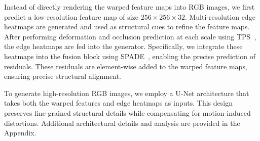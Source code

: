 Instead of directly rendering the warped feature maps into RGB images, we first predict a low-resolution feature map of size \( 256 \times 256 \times 32 \). Multi-resolution edge heatmaps are generated and used as structural cues to refine the feature maps. After performing deformation and occlusion prediction at each scale using TPS~\cite{zhao2022thin}, the edge heatmaps are fed into the generator. Specifically, we integrate these heatmaps into the fusion block using SPADE~\cite{park2019SPADE}, enabling the precise prediction of residuals. These residuals are element-wise added to the warped feature maps, ensuring precise structural alignment.

To generate high-resolution RGB images, we employ a U-Net architecture that takes both the warped features and edge heatmaps as inputs. This design preserves fine-grained structural details while compensating for motion-induced distortions. Additional architectural details and analysis are provided in the Appendix.






